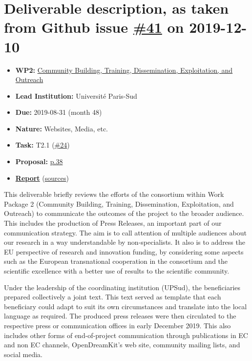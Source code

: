 \hypertarget{deliverable-description-as-taken-from-github-issue-41-on-2019-12-10}{%
\section*{\texorpdfstring{Deliverable description, as taken from Github
issue
\href{https://github.com/OpenDreamKit/OpenDreamKit/issues/41}{\#41} on
2019-12-10}{Deliverable description, as taken from Github issue \#41 on 2019-12-10}}\label{deliverable-description-as-taken-from-github-issue-41-on-2019-12-10}}

\begin{itemize}
\tightlist
\item
  \textbf{WP2:}
  \href{https://github.com/OpenDreamKit/OpenDreamKit/tree/master/WP2}{Community
  Building, Training, Dissemination, Exploitation, and Outreach}
\item
  \textbf{Lead Institution:} Université Paris-Sud
\item
  \textbf{Due:} 2019-08-31 (month 48)
\item
  \textbf{Nature:} Websites, Media, etc.
\item
  \textbf{Task:} T2.1
  (\href{https://github.com/OpenDreamKit/OpenDreamKit/issues/24}{\#24})
\item
  \textbf{Proposal:}
  \href{https://github.com/OpenDreamKit/OpenDreamKit/raw/master/Proposal/proposal-www.pdf}{p.38}
\item
  \textbf{\href{https://github.com/OpenDreamKit/OpenDreamKit/raw/master/WP2/D2.16/report-final.pdf}{Report}}
  (\href{https://github.com/OpenDreamKit/OpenDreamKit/raw/master/WP2/D2.16/}{sources})
\end{itemize}

This deliverable briefly reviews the efforts of the consortium within
Work Package 2 (Community Building, Training, Dissemination,
Exploitation, and Outreach) to communicate the outcomes of the project
to the broader audience. This includes the production of Press Releases,
an important part of our communication strategy. The aim is to call
attention of multiple audiences about our research in a way
understandable by non-specialists. It also is to address the EU
perspective of research and innovation funding, by considering some
aspects such as the European transnational cooperation in the consortium
and the scientific excellence with a better use of results to the
scientific community.

Under the leadership of the coordinating institution (UPSud), the
beneficiaries prepared collectively a joint text. This text served as
template that each beneficiary could adapt to suit its own circumstances
and translate into the local language as required. The produced press
releases were then circulated to the respective press or communication
offices in early December 2019. This also includes other forms of
end-of-project communication through publications in EC and non EC
channels, OpenDreamKit's web site, community mailing lists, and social
media.

